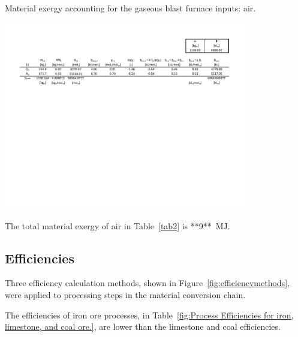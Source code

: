 \documentclass[energies,article,submit,pdftex,moreauthors]{Definitions/mdpi}
\begin{document}
\begin{table}
  \centering
  \caption{Material exergy accounting for the gaseous blast furnace inputs: air.}
  \label{fig:Gaseous Blast Furnace Inputs}
  \includegraphics[width=0.8\textwidth]{images/Air BF Inputs.pdf}

\end{table}

The total material exergy of air
in Table~\ref{tab2} is **9**~MJ.


\subsection{Efficiencies }
\label{ssec: efficiency}

Three efficiency calculation methods,
shown in Figure~\ref{fig:efficiencymethods},
were applied to processing steps
in the material conversion chain.
%
%

The efficiencies of iron ore processes,
in Table~\ref{fig:Process Efficiencies for iron, limestone, and coal ore.},
are lower than the limestone and coal efficiencies.
\end{document}
